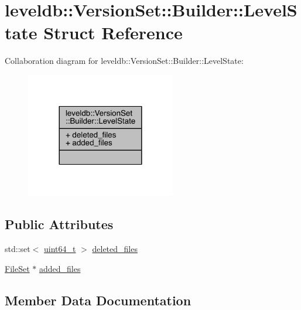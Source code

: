 \hypertarget{structleveldb_1_1_version_set_1_1_builder_1_1_level_state}{}\section{leveldb\+:\+:Version\+Set\+:\+:Builder\+:\+:Level\+State Struct Reference}
\label{structleveldb_1_1_version_set_1_1_builder_1_1_level_state}


Collaboration diagram for leveldb\+:\+:Version\+Set\+:\+:Builder\+:\+:Level\+State\+:\nopagebreak
\begin{figure}[H]
\begin{center}
\leavevmode
\includegraphics[width=185pt]{structleveldb_1_1_version_set_1_1_builder_1_1_level_state__coll__graph}
\end{center}
\end{figure}
\subsection*{Public Attributes}
\begin{DoxyCompactItemize}
\item 
std\+::set$<$ \hyperlink{stdint_8h_aaa5d1cd013383c889537491c3cfd9aad}{uint64\+\_\+t} $>$ \hyperlink{structleveldb_1_1_version_set_1_1_builder_1_1_level_state_ac92628909cea4ee134314b5884256619}{deleted\+\_\+files}
\item 
\hyperlink{classleveldb_1_1_version_set_1_1_builder_add38ea04d208ebaa9b486597c7b6246a}{File\+Set} $\ast$ \hyperlink{structleveldb_1_1_version_set_1_1_builder_1_1_level_state_aeb9a2d830ae2cc5f65c5395e3ece341d}{added\+\_\+files}
\end{DoxyCompactItemize}


\subsection{Member Data Documentation}
\hypertarget{structleveldb_1_1_version_set_1_1_builder_1_1_level_state_aeb9a2d830ae2cc5f65c5395e3ece341d}{}
